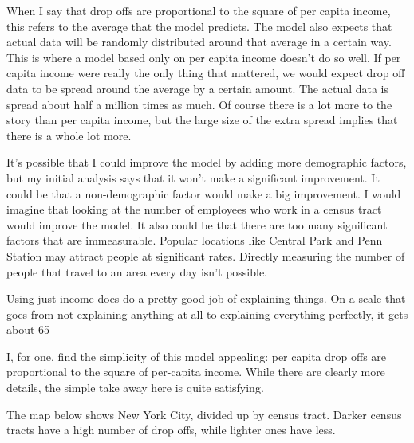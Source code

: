 When I say that drop offs are proportional to the square of per capita income, this refers to the average that the model predicts. The model also expects that actual data will be randomly distributed around that average in a certain way. This is where a model based only on per capita income doesn't do so well. If per capita income were really the only thing that mattered, we would expect drop off data to be spread around the average by a certain amount. The actual data is spread about half a million times as much. Of course there is a lot more to the story than per capita income, but the large size of the extra spread implies that there is a whole lot more.

It's possible that I could improve the model by adding more demographic factors, but my initial analysis says that it won't make a significant improvement. It could be that a non-demographic factor would make a big improvement. I would imagine that looking at the number of employees who work in a census tract would improve the model.  It also could be that there are too many significant factors that are immeasurable. Popular locations like Central Park and Penn Station may attract people at significant rates. Directly measuring the number of people that travel to an area every day isn't possible.

Using just income does do a pretty good job of explaining things. On a scale that goes from not explaining anything at all to explaining everything perfectly, it gets about 65%

I, for one, find the simplicity of this model appealing: per capita drop offs are proportional to the square of per-capita income. While there are clearly more details, the simple take away here is quite satisfying.




The map below shows New York City, divided up by census tract. Darker census tracts have a high number of drop offs, while lighter ones have less. 



